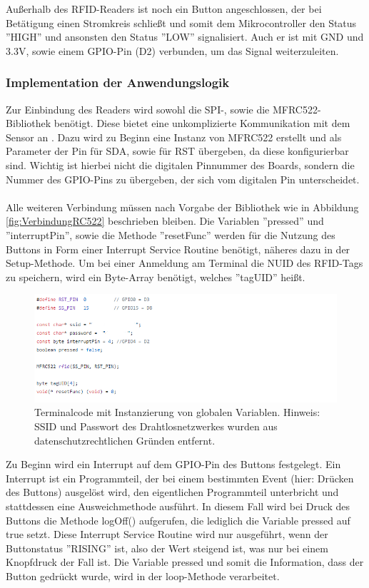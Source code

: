 \documentclass[12pt,titlepage]{scrartcl}
\begin{document}
			\noindent Außerhalb des RFID-Readers ist noch ein Button angeschlossen, der bei Betätigung einen Stromkreis schließt und somit dem Mikrocontroller den Status ''HIGH'' und ansonsten den Status ''LOW'' signalisiert. Auch er ist mit GND und 3.3V, sowie einem GPIO-Pin (D2) verbunden, um das Signal weiterzuleiten.
			\subsubsection{Implementation der Anwendungslogik} \label{logicTerminal}
			Zur Einbindung des Readers wird sowohl die SPI-, sowie die MFRC522-Bibliothek benötigt. Diese bietet eine unkomplizierte Kommunikation mit dem Sensor an \cite{mfrc522git}. Dazu wird zu Beginn eine Instanz von MFRC522 erstellt und als Parameter der Pin für SDA, sowie für RST übergeben, da diese konfigurierbar sind. Wichtig ist hierbei nicht die digitalen Pinnummer des Boards, sondern die Nummer des GPIO-Pins zu übergeben, der sich vom digitalen Pin unterscheidet. \\ \\
			Alle weiteren Verbindung müssen nach Vorgabe der Bibliothek wie in Abbildung \ref{fig:VerbindungRC522} beschrieben bleiben. Die Variablen ''pressed'' und ''interruptPin'', sowie die Methode ''resetFunc'' werden für die Nutzung des Buttons in Form einer Interrupt Service Routine benötigt, näheres dazu in der Setup-Methode. Um bei einer Anmeldung am Terminal die NUID des RFID-Tags zu speichern, wird ein Byte-Array benötigt, welches ''tagUID'' heißt.\\
		\begin{figure}[H] 
  			\centering
    		\includegraphics[height=0.25\textheight]{terminalHead}
  			\caption{Terminalcode mit Instanzierung von globalen Variablen. Hinweis: SSID und Passwort des Drahtlosnetzwerkes wurden aus datenschutzrechtlichen Gründen entfernt.}
  			\label{fig:terminalHead}
		\end{figure}
		\noindent Zu Beginn wird ein Interrupt auf dem GPIO-Pin des Buttons festgelegt. Ein Interrupt ist ein Programmteil, der bei einem bestimmten Event (hier: Drücken des Buttons) ausgelöst wird, den eigentlichen Programmteil unterbricht und stattdessen eine Ausweichmethode ausführt. In diesem Fall wird bei Druck des Buttons die Methode logOff() aufgerufen, die lediglich die Variable pressed auf true setzt. Diese Interrupt Service Routine wird nur ausgeführt, wenn der Buttonstatus ''RISING'' ist, also der Wert steigend ist, was nur bei einem Knopfdruck der Fall ist. Die Variable pressed und somit die Information, dass der Button gedrückt wurde, wird in der loop-Methode verarbeitet. \\ \\
\end{document}
